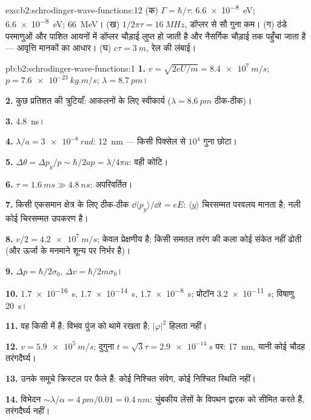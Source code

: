\begin{solution}{exo:b2:schrodinger-wave-functions:12}
(क) $\Gamma = \hbar/\tau$: \qty{6.6e-8}{eV}; \qty{6.6e-8}{eV}; \qty{66}{MeV}। (ख)
$1/2\pi\tau = \qty{16}{MHz}$, डॉप्लर से सौ गुना कम। (ग) ठंडे
परमाणुओं और पाशित आयनों में डॉप्लर चौड़ाई लुप्त हो जाती है और नैसर्गिक
चौड़ाई तक पहुँचा जाता है --- आवृत्ति मानकों का आधार। (घ) $c\tau =
\qty{3}{m}$, रेल की लंबाई।
\end{solution}

\begin{solution}{pb:b2:schrodinger-wave-functions:1}
\textbf{1.} $v = \sqrt{2eU/m} = \qty{8.4e7}{m/s}$; $p = \qty{7.6e-23}{kg.m/s}$; $\lambda =
\qty{8.7}{pm}$।

\textbf{2.} कुछ प्रतिशत की त्रुटियाँ: आकलनों के लिए स्वीकार्य ($\lambda =
\qty{8.6}{pm}$ ठीक-ठीक)।

\textbf{3.} \qty{4.8}{ns}।

\textbf{4.} $\lambda/a = \qty{3e-8}{rad}$: \qty{12}{nm} --- किसी पिक्सेल से $10^4$ गुना
छोटा।

\textbf{5.} $\Delta\theta = \Delta p_y/p \sim \hbar/2ap = \lambda/4\pi a$: वही कोटि।

\textbf{6.} $\tau = \qty{1.6}{ms} \gg \qty{4.8}{ns}$: अपरिवर्तित।

\textbf{7.} किसी एकसमान क्षेत्र के लिए ठीक-ठीक $\dd\langle p_y\rangle/\dd t = eE$:
$\langle y\rangle$ चिरसम्मत परवलय मानता है; नली कोई
चिरसम्मत उपकरण है।

\textbf{8.} $v/2 = \qty{4.2e7}{m/s}$; केवल  प्रेक्षणीय है;
किसी समतल तरंग की कला कोई संकेत नहीं ढोती (और ऊर्जा के मनमाने
शून्य पर निर्भर है)।

\textbf{9.} $\Delta p = \hbar/2\sigma_0$, $\Delta v = \hbar/2m\sigma_0$।

\textbf{10.} \qty{1.7e-16}{s}, \qty{1.7e-14}{s}, \qty{1.7e-8}{s}; प्रोटॉन \qty{3.2e-11}{s};
विषाणु \qty{20}{s}।

\textbf{11.} वह किसी  में है: विभव पुंज को थामे
रखता है; $|\varphi|^2$ हिलता नहीं।

\textbf{12.} $v = \qty{5.9e5}{m/s}$; दुगुना $t = \sqrt3\tau = \qty{2.9e-14}{s}$ पर:
\qty{17}{nm}, यानी कोई चौदह तरंगदैर्घ्य।

\textbf{13.} उनके  समूचे क्रिस्टल पर फैले हैं: कोई
निश्चित संवेग, कोई निश्चित स्थिति नहीं।

\textbf{14.} विभेदन $\sim\lambda/\alpha = \qty{4}{pm}/0.01 = \qty{0.4}{nm}$: चुंबकीय
लेंसों के विपथन द्वारक को सीमित करते हैं, तरंगदैर्घ्य नहीं।


\end{solution}
